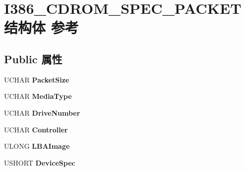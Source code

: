 \hypertarget{struct_i386___c_d_r_o_m___s_p_e_c___p_a_c_k_e_t}{}\section{I386\+\_\+\+C\+D\+R\+O\+M\+\_\+\+S\+P\+E\+C\+\_\+\+P\+A\+C\+K\+E\+T结构体 参考}
\label{struct_i386___c_d_r_o_m___s_p_e_c___p_a_c_k_e_t}
\subsection*{Public 属性}
\begin{DoxyCompactItemize}
\item 
\mbox{\label{struct_i386___c_d_r_o_m___s_p_e_c___p_a_c_k_e_t_a45cdc7d879c4d36ed538697d8c271044}} 
U\+C\+H\+AR {\bfseries Packet\+Size}
\item 
\mbox{\label{struct_i386___c_d_r_o_m___s_p_e_c___p_a_c_k_e_t_a81506a27a34812b01f29b0cd94ac0dce}} 
U\+C\+H\+AR {\bfseries Media\+Type}
\item 
\mbox{\label{struct_i386___c_d_r_o_m___s_p_e_c___p_a_c_k_e_t_a9d75105cc485d3a410bdce1065e0bff6}} 
U\+C\+H\+AR {\bfseries Drive\+Number}
\item 
\mbox{\label{struct_i386___c_d_r_o_m___s_p_e_c___p_a_c_k_e_t_ac661dbeb84f270d085b52ee74a3eb8f2}} 
U\+C\+H\+AR {\bfseries Controller}
\item 
\mbox{\label{struct_i386___c_d_r_o_m___s_p_e_c___p_a_c_k_e_t_ac2abde0056b3d12f16ef4fb3d25113a3}} 
U\+L\+O\+NG {\bfseries L\+B\+A\+Image}
\item 
\mbox{\label{struct_i386___c_d_r_o_m___s_p_e_c___p_a_c_k_e_t_a1c0f77eb654f5723b39fd7398a668aff}} 
U\+S\+H\+O\+RT {\bfseries Device\+Spec}
\item 
\mbox{\label{struct_i386___c_d_r_o_m___s_p_e_c___p_a_c_k_e_t_abdd03e7987003c949f471fbe7c54babb}} 

\end{DoxyCompactItemize}
